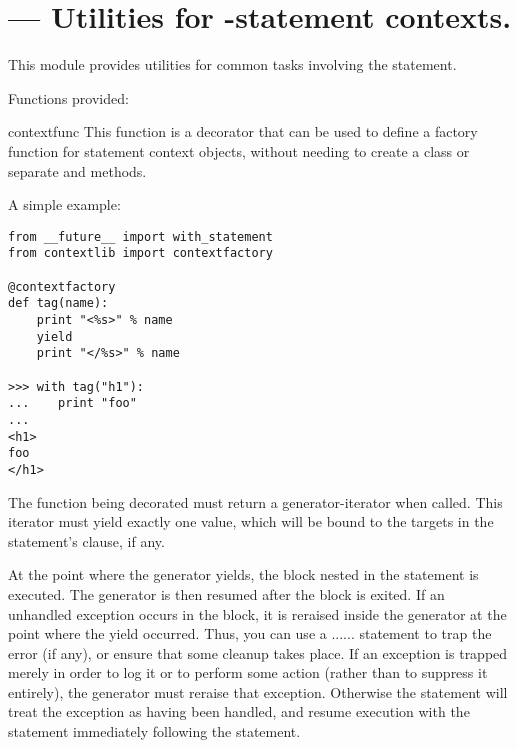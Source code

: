 \section{ ---
         Utilities for -statement contexts.}



This module provides utilities for common tasks involving the
 statement.

Functions provided:

\begin{funcdesc}{context}{func}
This function is a decorator that can be used to define a factory
function for  statement context objects, without
needing to create a class or separate  and
 methods.

A simple example:

\begin{verbatim}
from __future__ import with_statement
from contextlib import contextfactory

@contextfactory
def tag(name):
    print "<%s>" % name
    yield
    print "</%s>" % name

>>> with tag("h1"):
...    print "foo"
...
<h1>
foo
</h1>
\end{verbatim}

The function being decorated must return a generator-iterator when
called. This iterator must yield exactly one value, which will be
bound to the targets in the  statement's 
clause, if any.

At the point where the generator yields, the block nested in the
 statement is executed.  The generator is then resumed
after the block is exited.  If an unhandled exception occurs in the
block, it is reraised inside the generator at the point where the yield
occurred.  Thus, you can use a
...... statement to trap
the error (if any), or ensure that some cleanup takes place. If an
exception is trapped merely in order to log it or to perform some
action (rather than to suppress it entirely), the generator must
reraise that exception. Otherwise the  statement will
treat the exception as having been handled, and resume execution with
the statement immediately following the  statement.


\end{funcdesc}
